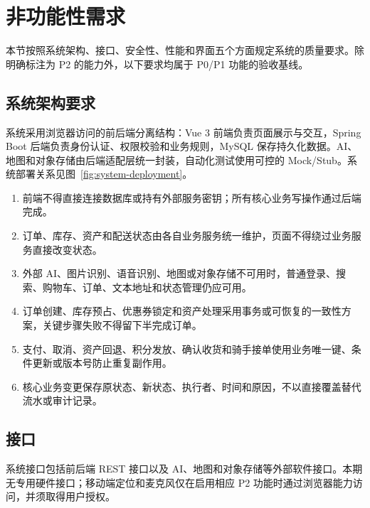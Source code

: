 \section{非功能性需求}

本节按照系统架构、接口、安全性、性能和界面五个方面规定系统的质量要求。除明确标注为 P2 的能力外，以下要求均属于 P0/P1 功能的验收基线。

\subsection{系统架构要求}

系统采用浏览器访问的前后端分离结构：Vue 3 前端负责页面展示与交互，Spring Boot 后端负责身份认证、权限校验和业务规则，MySQL 保存持久化数据。AI、地图和对象存储由后端适配层统一封装，自动化测试使用可控的 Mock/Stub。系统部署关系见图~\ref{fig:system-deployment}。


\begin{enumerate}
  \item 前端不得直接连接数据库或持有外部服务密钥；所有核心业务写操作通过后端完成。
  \item 订单、库存、资产和配送状态由各自业务服务统一维护，页面不得绕过业务服务直接改变状态。
  \item 外部 AI、图片识别、语音识别、地图或对象存储不可用时，普通登录、搜索、购物车、订单、文本地址和状态管理仍应可用。
  \item 订单创建、库存预占、优惠券锁定和资产处理采用事务或可恢复的一致性方案，关键步骤失败不得留下半完成订单。
  \item 支付、取消、资产回退、积分发放、确认收货和骑手接单使用业务唯一键、条件更新或版本号防止重复副作用。
  \item 核心业务变更保存原状态、新状态、执行者、时间和原因，不以直接覆盖替代流水或审计记录。
\end{enumerate}

\subsection{接口}

系统接口包括前后端 REST 接口以及 AI、地图和对象存储等外部软件接口。本期无专用硬件接口；移动端定位和麦克风仅在启用相应 P2 功能时通过浏览器能力访问，并须取得用户授权。

